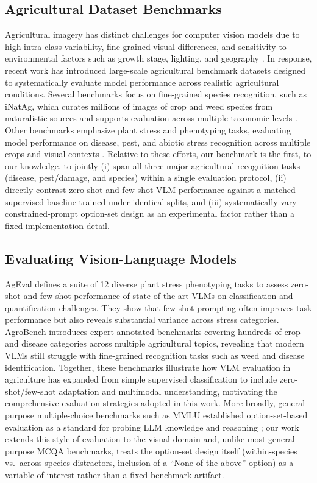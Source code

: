 \documentclass[10pt,letterpaper]{article}
\begin{document}
\subsection{Agricultural Dataset Benchmarks}
\label{sec:background_ag_benchmarks}
Agricultural imagery has distinct challenges for computer vision models due to high intra-class variability, fine-grained visual differences, and sensitivity to environmental factors such as growth stage, lighting, and geography \cite{min_computer_2025, upadhyay_deep_2025}. In response, recent work has introduced large-scale agricultural benchmark datasets designed to systematically evaluate model performance across realistic agricultural conditions. Several benchmarks focus on fine-grained species recognition, such as iNatAg, which curates millions of images of crop and weed species from naturalistic sources and supports evaluation across multiple taxonomic levels \cite{jain_inatag_nodate}. Other benchmarks emphasize plant stress and phenotyping tasks, evaluating model performance on disease, pest, and abiotic stress recognition across multiple crops and visual contexts \cite{joshi_standardizing_2023}. Relative to these efforts, our benchmark is the first, to our knowledge, to jointly (i) span all three major agricultural recognition tasks (disease, pest/damage, and species) within a single evaluation protocol, (ii) directly contrast zero-shot and few-shot VLM performance against a matched supervised baseline trained under identical splits, and (iii) systematically vary constrained-prompt option-set design as an experimental factor rather than a fixed implementation detail.
 
\subsection{Evaluating Vision-Language Models}
\label{sec:background_evaluating_vlms}
AgEval \cite{arshad_leveraging_2025} defines a suite of 12 diverse plant stress phenotyping tasks to assess zero-shot and few-shot performance of state-of-the-art VLMs on classification and quantification challenges. They show that few-shot prompting often improves task performance but also reveals substantial variance across stress categories. AgroBench \cite{shinoda_agrobench_2025} introduces expert-annotated benchmarks covering hundreds of crop and disease categories across multiple agricultural topics, revealing that modern VLMs still struggle with fine-grained recognition tasks such as weed and disease identification. Together, these benchmarks illustrate how VLM evaluation in agriculture has expanded from simple supervised classification to include zero-shot/few-shot adaptation and multimodal understanding, motivating the comprehensive evaluation strategies adopted in this work. More broadly, general-purpose multiple-choice benchmarks such as MMLU established option-set-based evaluation as a standard for probing LLM knowledge and reasoning \cite{hendrycks_measuring_2021}; our work extends this style of evaluation to the visual domain and, unlike most general-purpose MCQA benchmarks, treats the option-set design itself (within-species vs.\ across-species distractors, inclusion of a ``None of the above'' option) as a variable of interest rather than a fixed benchmark artifact.
\end{document}
